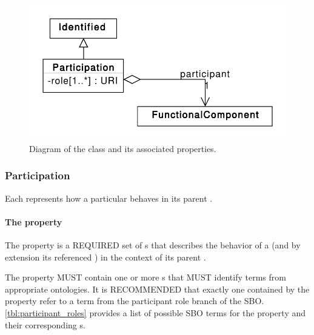 \begin{figure}[ht]
\begin{center}
\includegraphics[scale=0.6]{uml/participation}
\caption[]{Diagram of the  class and its associated properties.}
\label{uml:participation}
\end{center}
\end{figure}

\subsubsection{Participation}
\label{sec:Participation}

Each  represents how a particular  behaves in its parent
.

\paragraph{The  property}\label{sec:roles:P}

The  property is a REQUIRED set of s that describes the behavior of a  (and by extension its referenced ) in the context of its parent .

The  property MUST contain one or more s that MUST identify terms from appropriate ontologies. It is RECOMMENDED that exactly one  contained by the  property refer to a term from the participant role branch of the SBO. \ref{tbl:participant_roles} provides a list of possible SBO terms for the  property and their corresponding s.

